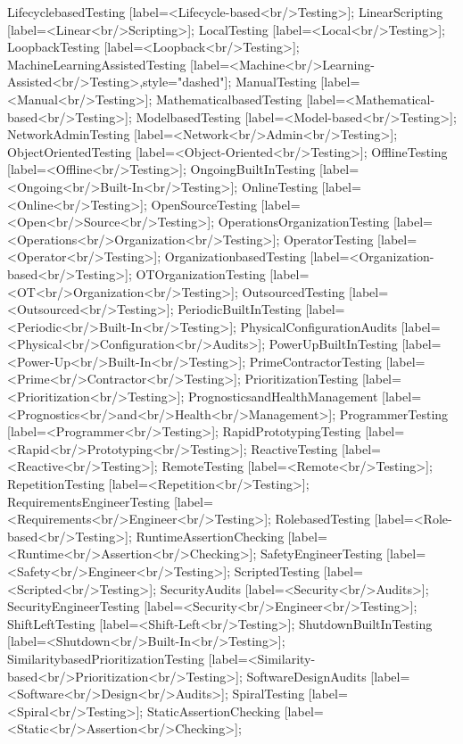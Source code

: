 \documentclass{article}
\begin{document}
{LifecyclebasedTesting [label=<Lifecycle-based<br/>Testing>];
LinearScripting [label=<Linear<br/>Scripting>];
LocalTesting [label=<Local<br/>Testing>];
LoopbackTesting [label=<Loopback<br/>Testing>];
MachineLearningAssistedTesting [label=<Machine<br/>Learning-Assisted<br/>Testing>,style="dashed"];
ManualTesting [label=<Manual<br/>Testing>];
MathematicalbasedTesting [label=<Mathematical-based<br/>Testing>];
ModelbasedTesting [label=<Model-based<br/>Testing>];
NetworkAdminTesting [label=<Network<br/>Admin<br/>Testing>];
ObjectOrientedTesting [label=<Object-Oriented<br/>Testing>];
OfflineTesting [label=<Offline<br/>Testing>];
OngoingBuiltInTesting [label=<Ongoing<br/>Built-In<br/>Testing>];
OnlineTesting [label=<Online<br/>Testing>];
OpenSourceTesting [label=<Open<br/>Source<br/>Testing>];
OperationsOrganizationTesting [label=<Operations<br/>Organization<br/>Testing>];
OperatorTesting [label=<Operator<br/>Testing>];
OrganizationbasedTesting [label=<Organization-based<br/>Testing>];
OTOrganizationTesting [label=<OT<br/>Organization<br/>Testing>];
OutsourcedTesting [label=<Outsourced<br/>Testing>];
PeriodicBuiltInTesting [label=<Periodic<br/>Built-In<br/>Testing>];
PhysicalConfigurationAudits [label=<Physical<br/>Configuration<br/>Audits>];
PowerUpBuiltInTesting [label=<Power-Up<br/>Built-In<br/>Testing>];
PrimeContractorTesting [label=<Prime<br/>Contractor<br/>Testing>];
PrioritizationTesting [label=<Prioritization<br/>Testing>];
PrognosticsandHealthManagement [label=<Prognostics<br/>and<br/>Health<br/>Management>];
ProgrammerTesting [label=<Programmer<br/>Testing>];
RapidPrototypingTesting [label=<Rapid<br/>Prototyping<br/>Testing>];
ReactiveTesting [label=<Reactive<br/>Testing>];
RemoteTesting [label=<Remote<br/>Testing>];
RepetitionTesting [label=<Repetition<br/>Testing>];
RequirementsEngineerTesting [label=<Requirements<br/>Engineer<br/>Testing>];
RolebasedTesting [label=<Role-based<br/>Testing>];
RuntimeAssertionChecking [label=<Runtime<br/>Assertion<br/>Checking>];
SafetyEngineerTesting [label=<Safety<br/>Engineer<br/>Testing>];
ScriptedTesting [label=<Scripted<br/>Testing>];
SecurityAudits [label=<Security<br/>Audits>];
SecurityEngineerTesting [label=<Security<br/>Engineer<br/>Testing>];
ShiftLeftTesting [label=<Shift-Left<br/>Testing>];
ShutdownBuiltInTesting [label=<Shutdown<br/>Built-In<br/>Testing>];
SimilaritybasedPrioritizationTesting [label=<Similarity-based<br/>Prioritization<br/>Testing>];
SoftwareDesignAudits [label=<Software<br/>Design<br/>Audits>];
SpiralTesting [label=<Spiral<br/>Testing>];
StaticAssertionChecking [label=<Static<br/>Assertion<br/>Checking>];
}
\end{document}
